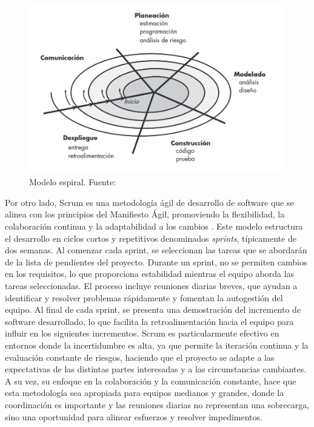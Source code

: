 \begin{figure}[!htb]
    \centering
    \includegraphics[width=\linewidth]{Figures/model-spiral.png}
    \caption{Modelo espiral. Fuente: \cite{pressman2010ingeneria}}
\end{figure}

Por otro lado, Scrum es una metodología ágil de desarrollo de software que se alinea con los principios del Manifiesto Ágil, promoviendo la flexibilidad, la colaboración continua y la adaptabilidad a los cambios \cite{pressman2010ingeneria}. Este modelo estructura el desarrollo en ciclos cortos y repetitivos denominados \textit{sprints}, típicamente de dos semanas. Al comenzar cada sprint, se seleccionan las tareas que se abordarán de la lista de pendientes del proyecto. Durante un sprint, no se permiten cambios en los requisitos, lo que proporciona estabilidad mientras el equipo aborda las tareas seleccionadas. El proceso incluye reuniones diarias breves, que ayudan a identificar y resolver problemas rápidamente y fomentan la autogestión del equipo. Al final de cada sprint, se presenta una demostración del incremento de software desarrollado, lo que facilita la retroalimentación hacia el equipo para influir en los siguientes incrementos. Scrum es particularmente efectivo en entornos donde la incertidumbre es alta, ya que permite la iteración continua y la evaluación constante de riesgos, haciendo que el proyecto se adapte a las expectativas de las distintas partes interesadas y a las circunstancias cambiantes. A su vez, su enfoque en la colaboración y la comunicación constante, hace que esta metodología sea apropiada para equipos medianos y grandes, donde la coordinación es importante y las reuniones diarias no representan una sobrecarga, sino una oportunidad para alinear esfuerzos y resolver impedimentos.

